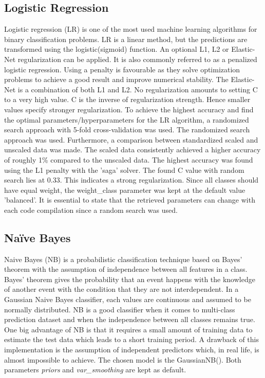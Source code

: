 \documentclass[11pt]{article}
\begin{document}
	\subsection{Logistic Regression}
	Logistic regression (LR) is one of the most used machine learning algorithms for binary classification problems. LR is a linear method, but the predictions are transformed using the logistic(sigmoid) function. An optional L1, L2 or Elastic-Net regularization can be applied. It is also commonly referred to as a penalized logistic regression. Using a penalty is favourable as they solve optimization problems to achieve a good result and improve numerical stability. The Elastic-Net is a combination of both L1 and L2.  No regularization amounts to setting C to a very high value. C is the inverse of regularization strength. Hence smaller values specify stronger regularization.
	To achieve the highest accuracy and find the optimal parameters/hyperparameters for the LR algorithm, a randomized search approach with 5-fold cross-validation was used. The randomized search approach was used. Furthermore, a comparison between standardized scaled and unscaled data was made. The scaled data consistently achieved a higher accuracy of roughly 1\% compared to the unscaled data. The highest accuracy was found using the L1 penalty with the 'saga' solver. The found C value with random search lies at 0.33. This indicates a strong regularization. Since all classes should have equal weight, the weight\_class parameter was kept at the default value 'balanced'. It is essential to state that the retrieved parameters can change with each code compilation since a random search was used.
	
	\subsection{Naïve Bayes}
	Naive Bayes (NB) is a probabilistic classification technique based on Bayes’ theorem with the assumption of independence between all features in a class. Bayes’ theorem gives the probability that an event happens with the knowledge of another event with the condition that they are not interdependent. In a Gaussian Naive Bayes classifier, each values are continuous and assumed to be normally distributed.
	\medbreak
	NB is a good classifier when it comes to multi-class prediction dataset and when the independence between all classes remains true. One big advantage of NB is that it requires a small amount of training data to estimate the test data which leads to a short training period. A drawback of this implementation is the assumption of independent predictors which, in real life, is almost impossible to achieve. 
	\medbreak
	The chosen model is the GaussianNB(). Both parameters \textit{priors} and \textit{var\_smoothing} are kept as default.
\end{document}
